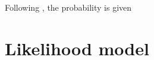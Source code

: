 \documentclass[a4paper,fleqn,usenatbib]{mnras}
\begin{document}
Following \citet{TepperGarcia2006}, the probability is given

\section{Likelihood model}







\bsp	%
\label{lastpage}
\end{document}
